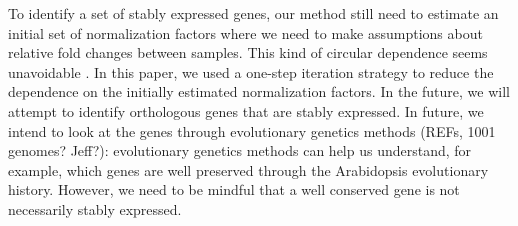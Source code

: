 				
				
				To identify a set of stably expressed genes, our method still need to estimate
				an initial set of normalization factors where we need to make assumptions
				about relative fold changes between samples. This kind of circular dependence
				seems unavoidable \citep{vandesompele2002accurate}. In this paper, we used a
				one-step iteration strategy to reduce the dependence on the initially
				estimated normalization factors.  In the future, we will attempt to identify
				orthologous genes that are stably expressed.  In future, we intend to look at
				the genes through evolutionary genetics methods (REFs, 1001 genomes? Jeff?):
				evolutionary genetics methods can help us understand, for example, which genes
				are well preserved through the Arabidopsis evolutionary history. However, we
				need to be mindful that a well conserved gene is not necessarily stably
				expressed. 
				
